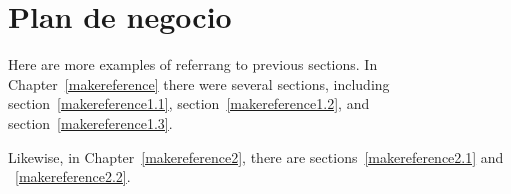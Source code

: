 
\cleardoublepage


\chapter{Plan de negocio}
\label{makereference8}

Here are more examples of referrang to previous sections.  In
Chapter~\ref{makereference} there were several sections, including
section~\ref{makereference1.1}, section~\ref{makereference1.2},
and section~\ref{makereference1.3}.

Likewise, in Chapter~\ref{makereference2}, there are
sections~\ref{makereference2.1} and ~\ref{makereference2.2}.
